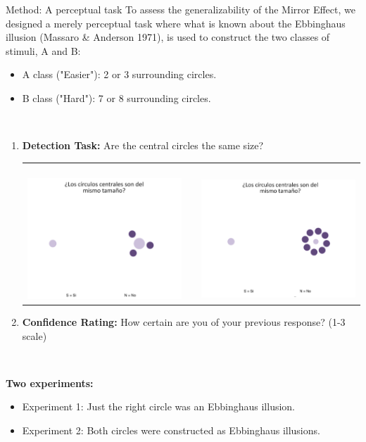 \documentclass[final]{beamer}
\newlength{\onecolwid}
\begin{document}
\begin{frame}[t]
\begin{columns}[t]
\begin{column}{\onecolwid}
\begin{alertblock}{Method: A perceptual task}
To assess the generalizability of the Mirror Effect, we designed a merely perceptual task where what is known about the Ebbinghaus illusion (Massaro \& Anderson  1971), is used to construct the two classes of stimuli, A and B:

\begin{itemize}
\item A class ("Easier"): 2 or 3 surrounding circles.
\item B class ("Hard"): 7 or 8 surrounding circles.
\end{itemize}

$\quad$
\begin{enumerate}
\item \textbf{Detection Task:} Are the central circles the same size?
\begin{tabular}{ccc}
$\qquad$ \includegraphics[width=0.35\linewidth]{Figures/MainTask.png} & \hfill & $\qquad$\includegraphics[width=0.35\linewidth]{Figures/MainTask2.png}
\end{tabular}
\item \textbf{Confidence Rating:} How certain are you of your previous response? (1-3 scale)
\end{enumerate}
$\qquad$

\textbf{Two experiments:} 

\begin{itemize}
\item Experiment 1: Just the right circle was an Ebbinghaus illusion.
\item Experiment 2: Both circles were constructed as Ebbinghaus illusions.
\end{itemize}
$\qquad$
\end{alertblock}


\end{column}
\end{columns}
\end{frame}
\end{document}
